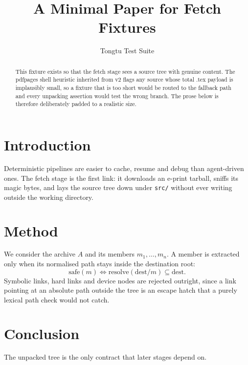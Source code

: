 \documentclass[11pt]{article}
\title{A Minimal Paper for Fetch Fixtures}
\author{Tongtu Test Suite}
\begin{document}
\maketitle

\begin{abstract}
This fixture exists so that the fetch stage sees a source tree with genuine
content. The pdfpages shell heuristic inherited from v2 flags any source whose
total .tex payload is implausibly small, so a fixture that is too short would be
routed to the fallback path and every unpacking assertion would test the wrong
branch. The prose below is therefore deliberately padded to a realistic size.
\end{abstract}

\section{Introduction}
Deterministic pipelines are easier to cache, resume and debug than agent-driven
ones. The fetch stage is the first link: it downloads an e-print tarball, sniffs
its magic bytes, and lays the source tree down under \texttt{src/} without ever
writing outside the working directory.

\section{Method}
We consider the archive $A$ and its members $m_1,\dots,m_n$. A member is
extracted only when its normalised path stays inside the destination root:
\begin{equation}
  \mathrm{safe}(m) \iff \mathrm{resolve}(\mathrm{dest} / m) \subseteq \mathrm{dest}.
\end{equation}
Symbolic links, hard links and device nodes are rejected outright, since a link
pointing at an absolute path outside the tree is an escape hatch that a purely
lexical path check would not catch.



\section{Conclusion}
The unpacked tree is the only contract that later stages depend on.
\end{document}
